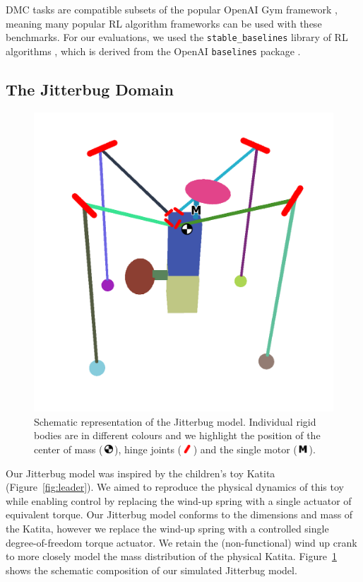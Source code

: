 \documentclass[letterpaper, 10 pt, conference]{ieeeconf}
\newcommand{\com}{\,\includegraphics[width=9pt]{ico-com}\,}
\newcommand{\hinge}{\,\includegraphics[width=9pt]{ico-hinge}\,}
\newcommand{\motor}{\,\includegraphics[width=9pt]{ico-motor}\,}
\begin{document}
DMC tasks are compatible subsets of the popular OpenAI Gym framework \cite{Brockman2016Gym}, meaning many popular RL algorithm frameworks can be used with these benchmarks.
For our evaluations, we used the \texttt{stable\_baselines} library of RL algorithms \cite{Hill2018Stable}, which is derived from the OpenAI \texttt{baselines} package \cite{Dhariwal2017Baselines}.

\subsection{The Jitterbug Domain}

\begin{figure}[t]
    \centering
    \includegraphics[width=\linewidth]{fig-jitterbug-parts}
    \caption[
        Schematic representation of the Jitterbug model.
        Individual rigid bodies are in different colours and we highlight the position of the center of mass, hinge joints and the single motor.
    ]{
        Schematic representation of the Jitterbug model.
        Individual rigid bodies are in different colours and we highlight the position of the center of mass (\protect\com), hinge joints  (\protect\hinge) and the single motor (\protect\motor).
    }
    \label{fig:parts}
\end{figure}

Our Jitterbug model was inspired by the children's toy Katita (Figure~\ref{fig:leader}).
We aimed to reproduce the physical dynamics of this toy while enabling control by replacing the wind-up spring with a single actuator of equivalent torque.
Our Jitterbug model conforms to the dimensions and mass of the Katita, however we replace the wind-up spring with a controlled single degree-of-freedom torque actuator.
We retain the (non-functional) wind up crank to more closely model the mass distribution of the physical Katita.
Figure~\ref{fig:parts} shows the schematic composition of our simulated Jitterbug model.
\end{document}
